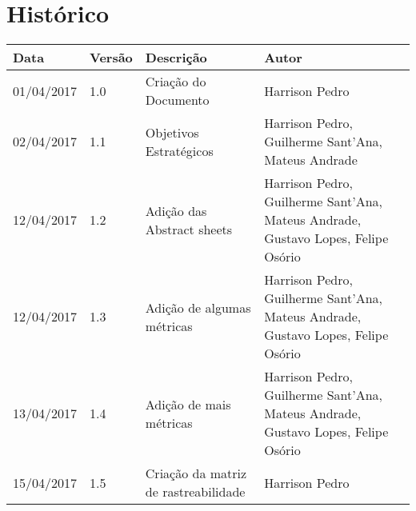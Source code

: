 \chapter{Histórico}

\begin{tabular}{ |p{3cm}|p{3cm}|p{3cm}|p{3cm}|  }
 \hline
 Data 		& 		Versão & 		Descrição 			& 		Autor\\
 \hline\hline
 01/04/2017 & 		1.0    &		Criação do Documento &   	Harrison Pedro \\ 
 \hline
 02/04/2017 & 		1.1    &		Objetivos Estratégicos &   	Harrison Pedro, Guilherme Sant'Ana, Mateus Andrade \\ 
 \hline
 12/04/2017 & 		1.2    &		Adição das Abstract sheets  &   	Harrison Pedro, Guilherme Sant'Ana, Mateus Andrade, Gustavo Lopes, Felipe Osório \\ 
 \hline
 12/04/2017 & 		1.3    &		Adição de algumas métricas  &   	Harrison Pedro, Guilherme Sant'Ana, Mateus Andrade, Gustavo Lopes, Felipe Osório \\ 
 \hline
 13/04/2017 & 		1.4    &		Adição de mais métricas  &   	Harrison Pedro, Guilherme Sant'Ana, Mateus Andrade, Gustavo Lopes, Felipe Osório \\ 
 \hline
 15/04/2017 & 		1.5    &		Criação da matriz de rastreabilidade  &   	Harrison Pedro \\ 
 \hline

\end{tabular}

